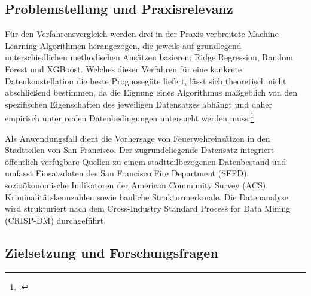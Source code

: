 \documentclass[12pt,a4paper]{article}
\begin{document}
\subsection{Problemstellung und Praxisrelevanz}


Für den Verfahrensvergleich werden drei in der Praxis verbreitete Machine-Learning-Algorithmen
herangezogen, die jeweils auf grundlegend unterschiedlichen methodischen Ansätzen basieren:
Ridge Regression, Random Forest und XGBoost. Welches dieser Verfahren für eine konkrete
Datenkonstellation die beste Prognosegüte liefert, lässt sich theoretisch nicht abschließend
bestimmen, da die Eignung eines Algorithmus maßgeblich von den spezifischen Eigenschaften des
jeweiligen Datensatzes abhängt und daher empirisch unter realen Datenbedingungen untersucht
werden muss.\footcite[3133, 3175]{FernandezDelgado2014}

Als Anwendungsfall dient die Vorhersage von Feuerwehreinsätzen in den Stadtteilen von
San Francisco. Der zugrundeliegende Datensatz integriert öffentlich verfügbare Quellen zu einem
stadtteilbezogenen Datenbestand und umfasst Einsatzdaten des San Francisco Fire Department
(SFFD), sozioökonomische Indikatoren der American Community Survey (ACS), Kriminalitätskennzahlen
sowie bauliche Strukturmerkmale. Die Datenanalyse wird strukturiert nach dem Cross-Industry
Standard Process for Data Mining (CRISP-DM) durchgeführt.

\subsection{Zielsetzung und Forschungsfragen}

\end{document}

